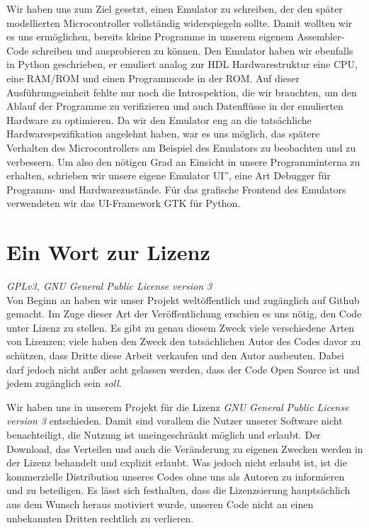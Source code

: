 Wir haben uns zum Ziel gesetzt, einen Emulator zu schreiben, der den später modellierten Microcontroller vollständig widerspiegeln sollte. Damit wollten wir es uns ermöglichen, bereits kleine Programme in unserem eigenem Assembler-Code schreiben und ausprobieren zu können. Den Emulator haben wir ebenfalls in Python geschrieben, er emuliert analog zur HDL Hardwarestruktur eine CPU, eine RAM/ROM und einen Programmcode in der ROM. Auf dieser Ausführungseinheit fehlte nur noch die Introspektion, die wir brauchten, um den Ablauf der Programme zu verifizieren und auch Datenflüsse in der emulierten Hardware zu optimieren. Da wir den Emulator eng an die tatsächliche Hardwarespezifikation angelehnt haben, war es uns möglich, das spätere Verhalten des Microcontrollers am Beispiel des Emulators zu beobachten und zu verbessern. Um also den nötigen Grad an Einsicht in unsere Programminterna zu erhalten, schrieben wir unsere eigene \glqq Emulator UI'', eine Art Debugger für Programm- und Hardwarezustände. Für das grafische Frontend des Emulators verwendeten wir das UI-Framework GTK für Python.

\section{Ein Wort zur Lizenz}
\textit{GPLv3, GNU General Public License version 3}\\
Von Beginn an haben wir unser Projekt weltöffentlich und zugänglich auf Github gemacht. Im Zuge dieser Art der Veröffentlichung erschien es uns nötig, den Code unter Lizenz zu stellen. Es gibt zu genau diesem Zweck viele verschiedene Arten von Lizenzen; viele haben den Zweck den tatsächlichen Autor des Codes davor zu schützen, dass Dritte diese Arbeit verkaufen und den Autor ausbeuten. Dabei darf jedoch nicht außer acht gelassen werden, dass der Code Open Source ist und jedem zugänglich sein \textit{soll}.

Wir haben uns in unserem Projekt für die Lizenz \textit{GNU General Public License version 3} entschieden. Damit sind vorallem die Nutzer unserer Software nicht benachteiligt, die Nutzung ist uneingeschränkt möglich und erlaubt. Der Download, das Verteilen und auch die Veränderung zu eigenen Zwecken werden in der Lizenz behandelt und explizit erlaubt. Was jedoch nicht erlaubt ist, ist die kommerzielle Distribution unseres Codes ohne uns als Autoren zu informieren und zu beteiligen. Es lässt sich festhalten, dass die Lizenzsierung hauptsächlich aus dem Wunsch heraus motiviert wurde, unseren Code nicht an einen unbekannten Dritten rechtlich zu verlieren.

